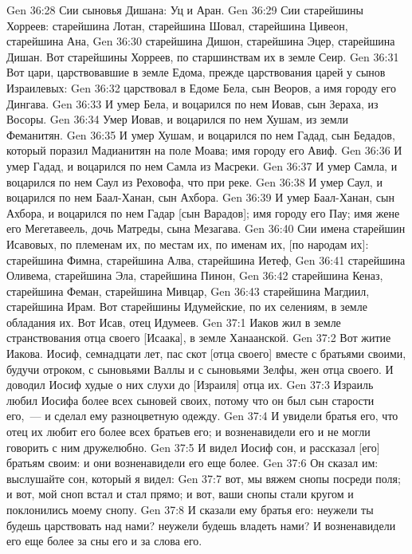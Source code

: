 \vs Gen 36:28 Сии сыновья Дишана: Уц и Аран.
\vs Gen 36:29 Сии старейшины Хорреев: старейшина Лотан, старейшина Шовал, старейшина Цивеон, старейшина Ана,
\vs Gen 36:30 старейшина Дишон, старейшина Эцер, старейшина Дишан. Вот старейшины Хорреев, по старшинствам их в земле Сеир.
\rsbpar\vs Gen 36:31 Вот цари, царствовавшие в земле Едома, прежде царствования царей у сынов Израилевых:
\vs Gen 36:32 царствовал в Едоме Бела, сын Веоров, а имя городу его Дингава.
\vs Gen 36:33 И умер Бела, и воцарился по нем Иовав, сын Зераха, из Восоры.
\vs Gen 36:34 Умер Иовав, и воцарился по нем Хушам, из земли Феманитян.
\vs Gen 36:35 И умер Хушам, и воцарился по нем Гадад, сын Бедадов, который поразил Мадианитян на поле Моава; имя городу его Авиф.
\vs Gen 36:36 И умер Гадад, и воцарился по нем Самла из Масреки.
\vs Gen 36:37 И умер Самла, и воцарился по нем Саул из Реховофа, что при реке.
\vs Gen 36:38 И умер Саул, и воцарился по нем Баал-Ханан, сын Ахбора.
\vs Gen 36:39 И умер Баал-Ханан, сын Ахбора, и воцарился по нем Гадар [сын Варадов]; имя городу его Пау; имя жене его Мегетавеель, дочь Матреды, сына Мезагава.
\rsbpar\vs Gen 36:40 Сии имена старейшин Исавовых, по племенам их, по местам их, по именам их, [по народам их]: старейшина Фимна, старейшина Алва, старейшина Иетеф,
\vs Gen 36:41 старейшина Оливема, старейшина Эла, старейшина Пинон,
\vs Gen 36:42 старейшина Кеназ, старейшина Феман, старейшина Мивцар,
\vs Gen 36:43 старейшина Магдиил, старейшина Ирам. Вот старейшины Идумейские, по их селениям, в земле обладания их. Вот Исав, отец Идумеев.
\vs Gen 37:1 Иаков жил в земле странствования отца своего [Исаака], в земле Ханаанской.
\vs Gen 37:2 Вот житие Иакова. Иосиф, семнадцати лет, пас скот [отца своего] вместе с братьями своими, будучи отроком, с сыновьями Валлы и с сыновьями Зелфы, жен отца своего. И доводил Иосиф худые о них слухи до [Израиля] отца их.
\vs Gen 37:3 Израиль любил Иосифа более всех сыновей своих, потому что он был сын старости его,~--- и сделал ему разноцветную одежду.
\vs Gen 37:4 И увидели братья его, что отец их любит его более всех братьев его; и возненавидели его и не могли говорить с ним дружелюбно.
\vs Gen 37:5 И видел Иосиф сон, и рассказал [его] братьям своим: и они возненавидели его еще более.
\vs Gen 37:6 Он сказал им: выслушайте сон, который я видел:
\vs Gen 37:7 вот, мы вяжем снопы посреди поля; и вот, мой сноп встал и стал прямо; и вот, ваши снопы стали кругом и поклонились моему снопу.
\vs Gen 37:8 И сказали ему братья его: неужели ты будешь царствовать над нами? неужели будешь владеть нами? И возненавидели его еще более за сны его и за слова его.
